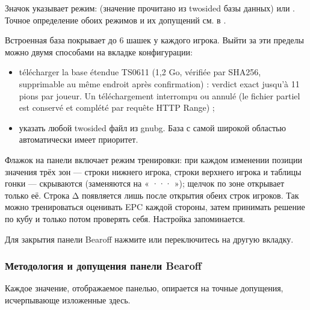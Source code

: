 \documentclass[letterpaper,10pt,russian]{sphinxmanual}
\begin{document}
\sphinxAtStartPar
Значок указывает режим:  (значение прочитано из two\sphinxhyphen{}sided базы данных) или . Точное определение обоих режимов и их допущений см. в {\hyperref[\detokenize{manuel:epc-methodologie}]{}}.

\sphinxAtStartPar
{} Встроенная база покрывает до 6 шашек у каждого игрока. Выйти за эти пределы можно двумя способами на вкладке  конфигурации:
\begin{itemize}
\item {} 
\sphinxAtStartPar
télécharger la base étendue TS\sphinxhyphen{}06\sphinxhyphen{}11 (1,2 Go, vérifiée par SHA\sphinxhyphen{}256,
supprimable au même endroit après confirmation) : verdict exact jusqu’à
11 pions par joueur. Un téléchargement interrompu ou annulé  (le fichier partiel est conservé et complété par
requête HTTP Range) ;

\item {} 
\sphinxAtStartPar
указать любой two\sphinxhyphen{}sided файл  из gnubg. База с самой широкой областью автоматически имеет приоритет.

\end{itemize}

\sphinxAtStartPar
{} Флажок  на панели включает режим тренировки: при каждом изменении позиции значения трёх зон — строки нижнего игрока, строки верхнего игрока и таблицы гонки — скрываются (заменяются на « ··· »); щелчок по зоне открывает только её. Строка Δ появляется лишь после открытия обеих строк игроков. Так можно тренироваться оценивать EPC каждой стороны, затем принимать решение по кубу и только потом проверять себя. Настройка запоминается.

\sphinxAtStartPar
Для закрытия панели Bearoff нажмите  или переключитесь на другую вкладку.


\subsubsection{Методология и допущения панели Bearoff}
\label{\detokenize{manuel:methodologie-et-hypotheses-du-panneau-bearoff}}\label{\detokenize{manuel:epc-methodologie}}
\sphinxAtStartPar
Каждое значение, отображаемое панелью, опирается на точные допущения, исчерпывающе изложенные здесь.
\end{document}
